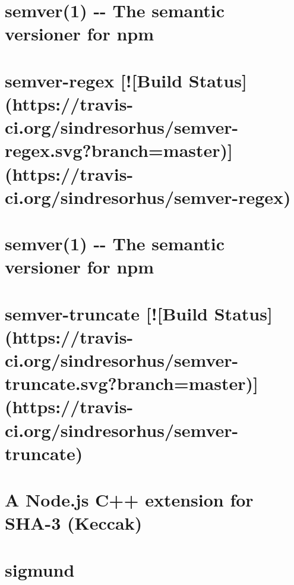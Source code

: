 \documentclass[twoside]{book}
\newcommand{\+}{\discretionary{\mbox{\scriptsize$\hookleftarrow$}}{}{}}
\begin{document}
\chapter{semver(1) -\/-\/ The semantic versioner for npm}
\label{md_app_web_node_modules_semver__r_e_a_d_m_e}

\chapter{semver-\/regex \mbox{[}!\mbox{[}Build Status\mbox{]}(https\+://travis-\/ci.org/sindresorhus/semver-\/regex.svg?branch=master)\mbox{]}(https\+://travis-\/ci.org/sindresorhus/semver-\/regex)}
\label{md_app_web_node_modules_semver-regex_readme}

\chapter{semver(1) -\/-\/ The semantic versioner for npm}
\label{md_app_web_node_modules_semver-truncate_node_modules_semver__r_e_a_d_m_e}

\chapter{semver-\/truncate \mbox{[}!\mbox{[}Build Status\mbox{]}(https\+://travis-\/ci.org/sindresorhus/semver-\/truncate.svg?branch=master)\mbox{]}(https\+://travis-\/ci.org/sindresorhus/semver-\/truncate)}
\label{md_app_web_node_modules_semver-truncate_readme}

\chapter{A Node.\+js C++ extension for S\+H\+A-\/3 (Keccak)}
\label{md_app_web_node_modules_sha3__r_e_a_d_m_e}

\chapter{sigmund}
\label{md_app_web_node_modules_sigmund__r_e_a_d_m_e}

\end{document}

